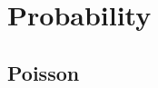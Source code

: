 \documentclass[12pt]{article}
\title{}
\author{}
\begin{document}
\maketitle

\begin{abstract}

\end{abstract}

\section{Probability}

\subsection*{Poisson}
\end{document}
